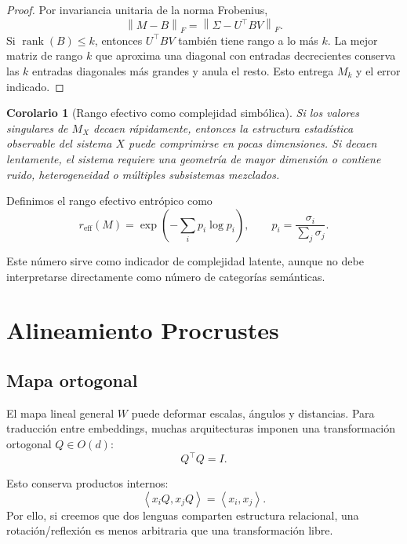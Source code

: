 \documentclass[11pt,a4paper]{article}
\newtheorem{corollary}[theorem]{Corolario}
\DeclareMathOperator{\rank}{rank}
\newcommand{\1}{\mathbf{1}}
\newcommand{\norm}[1]{\left\lVert #1 \right\rVert}
\newcommand{\inner}[2]{\left\langle #1,#2 \right\rangle}
\numberwithin{equation}{section}
\begin{document}
\begin{proof}
Por invariancia unitaria de la norma Frobenius,
\[
    \norm{M-B}_F
    =
    \norm{\Sigma-U^\top B V}_F.
\]
Si \(\rank(B)\leq k\), entonces \(U^\top B V\) también tiene rango a lo más \(k\). La mejor matriz de rango \(k\) que aproxima una diagonal con entradas decrecientes conserva las \(k\) entradas diagonales más grandes y anula el resto. Esto entrega \(M_k\) y el error indicado.
\end{proof}

\begin{corollary}[Rango efectivo como complejidad simbólica]
Si los valores singulares de \(M_X\) decaen rápidamente, entonces la estructura estadística observable del sistema \(X\) puede comprimirse en pocas dimensiones. Si decaen lentamente, el sistema requiere una geometría de mayor dimensión o contiene ruido, heterogeneidad o múltiples subsistemas mezclados.
\end{corollary}

Definimos el rango efectivo entrópico como
\begin{equation}
    r_{\mathrm{eff}}(M)
    =
    \exp\left(
    -\sum_i p_i\log p_i
    \right),
    \qquad
    p_i=
    \frac{\sigma_i}{\sum_j \sigma_j}.
\end{equation}

Este número sirve como indicador de complejidad latente, aunque no debe interpretarse directamente como número de categorías semánticas.

\section{Alineamiento Procrustes}

\subsection{Mapa ortogonal}

El mapa lineal general \(W\) puede deformar escalas, ángulos y distancias. Para traducción entre embeddings, muchas arquitecturas imponen una transformación ortogonal \(Q\in O(d)\):
\begin{equation}
    Q^\top Q=I.
\end{equation}

Esto conserva productos internos:
\[
    \inner{x_iQ}{x_jQ}=\inner{x_i}{x_j}.
\]
Por ello, si creemos que dos lenguas comparten estructura relacional, una rotación/reflexión es menos arbitraria que una transformación libre.
\end{document}
